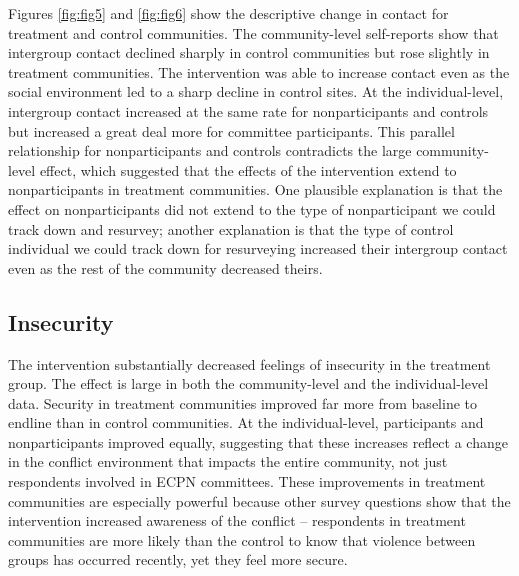\documentclass[11pt]{article}
\begin{document}
Figures \ref{fig:fig5} and \ref{fig:fig6} show the descriptive change in
contact for treatment and control communities. The community-level
self-reports show that intergroup contact declined sharply in control
communities but rose slightly in treatment communities. The intervention
was able to increase contact even as the social environment led to a
sharp decline in control sites. At the individual-level, intergroup
contact increased at the same rate for nonparticipants and controls but
increased a great deal more for committee participants. This parallel
relationship for nonparticipants and controls contradicts the large
community-level effect, which suggested that the effects of the
intervention extend to nonparticipants in treatment communities. One
plausible explanation is that the effect on nonparticipants did not
extend to the type of nonparticipant we could track down and resurvey;
another explanation is that the type of control individual we could
track down for resurveying increased their intergroup contact even as
the rest of the community decreased theirs.

\hypertarget{insecurity}{%
\subsection{Insecurity}\label{insecurity}}

The intervention substantially decreased feelings of insecurity in the
treatment group. The effect is large in both the community-level and the
individual-level data. Security in treatment communities improved far
more from baseline to endline than in control communities. At the
individual-level, participants and nonparticipants improved equally,
suggesting that these increases reflect a change in the conflict
environment that impacts the entire community, not just respondents
involved in ECPN committees. These improvements in treatment communities
are especially powerful because other survey questions show that the
intervention increased awareness of the conflict -- respondents in
treatment communities are more likely than the control to know that
violence between groups has occurred recently, yet they feel more
secure.
\end{document}
